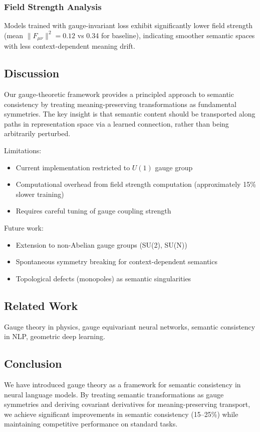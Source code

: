 \documentclass{article}
\numberwithin{equation}{section}
\begin{document}
\subsubsection{Field Strength Analysis}
Models trained with gauge-invariant loss exhibit significantly lower field strength (mean $\|F_{\mu\nu}\|^2 = 0.12$ vs 0.34 for baseline), indicating smoother semantic spaces with less context-dependent meaning drift.

\subsection{Discussion}
Our gauge-theoretic framework provides a principled approach to semantic consistency by treating meaning-preserving transformations as fundamental symmetries. The key insight is that semantic content should be transported along paths in representation space via a learned connection, rather than being arbitrarily perturbed.

Limitations:
\begin{itemize}
\item Current implementation restricted to $U(1)$ gauge group
\item Computational overhead from field strength computation (approximately 15\% slower training)
\item Requires careful tuning of gauge coupling strength
\end{itemize}

Future work:
\begin{itemize}
\item Extension to non-Abelian gauge groups (SU(2), SU(N))
\item Spontaneous symmetry breaking for context-dependent semantics
\item Topological defects (monopoles) as semantic singularities
\end{itemize}

\subsection{Related Work}
Gauge theory in physics, gauge equivariant neural networks, semantic consistency in NLP, geometric deep learning.

\subsection{Conclusion}
We have introduced gauge theory as a framework for semantic consistency in neural language models. By treating semantic transformations as gauge symmetries and deriving covariant derivatives for meaning-preserving transport, we achieve significant improvements in semantic consistency (15--25\%) while maintaining competitive performance on standard tasks.
\end{document}
